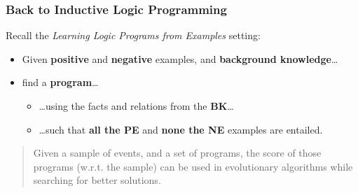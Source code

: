\documentclass[bigger]{beamer}
\begin{document}
%
\begin{frame}
    \frametitle{Back to Inductive Logic Programming}
    \vfill
    Recall the \emph{Learning Logic Programs from Examples} setting:
    \begin{itemize}
        \item Given \textbf{positive} and \textbf{negative} examples, and \textbf{background knowledge}\ldots
        \item find a \textbf{program}\ldots
              \begin{itemize}
                  \item \ldots using the facts and relations from the \textbf{BK}\ldots
                  \item \ldots such that \textbf{all the PE} and \textbf{none the NE} examples are entailed.
              \end{itemize}
    \end{itemize}
    \vfill
    \begin{quotation}
        Given a sample of events, and a set of programs, \alert{the score} of those programs (w.r.t. the sample) \alert{can be used in evolutionary algorithms} while searching for better solutions.
    \end{quotation}
\end{frame}
%
%
\end{document}
